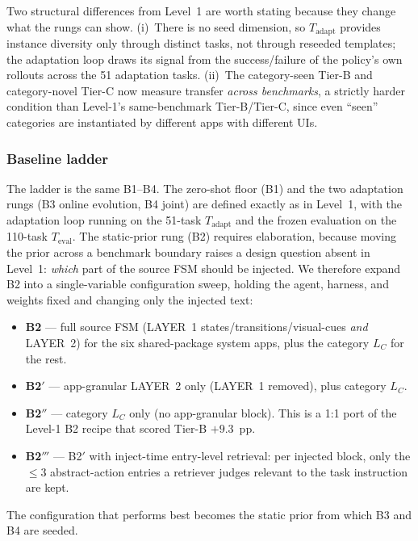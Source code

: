 Two structural differences from Level~1 are worth stating because they change
what the rungs can show. (i)~There is no seed dimension, so $T_{\text{adapt}}$
provides instance diversity only through distinct tasks, not through reseeded
templates; the adaptation loop draws its signal from the success/failure of the
policy's own rollouts across the 51 adaptation tasks. (ii)~The category-seen
Tier-B and category-novel Tier-C now measure transfer \emph{across benchmarks},
a strictly harder condition than Level-1's same-benchmark Tier-B/Tier-C, since
even ``seen'' categories are instantiated by different apps with different UIs.

\subsubsection{Baseline ladder}
\label{sec:exp-cross-baselines}

The ladder is the same B1--B4. The zero-shot floor (B1) and the two adaptation
rungs (B3 online evolution, B4 joint) are defined exactly as in Level~1, with
the adaptation loop running on the 51-task $T_{\text{adapt}}$ and the frozen
evaluation on the 110-task $T_{\text{eval}}$. The static-prior rung (B2)
requires elaboration, because moving the prior across a benchmark boundary
raises a design question absent in Level~1: \emph{which} part of the source FSM
should be injected. We therefore expand B2 into a single-variable configuration
sweep, holding the agent, harness, and weights fixed and changing only the
injected text:

\begin{itemize}
\item \textbf{B2} --- full source FSM (LAYER~1 states/transitions/visual-cues
\emph{and} LAYER~2) for the six shared-package system apps, plus the category
$L_C$ for the rest.
\item \textbf{B2$'$} --- app-granular LAYER~2 only (LAYER~1 removed), plus
category $L_C$.
\item \textbf{B2$''$} --- category $L_C$ only (no app-granular block). This is a
1:1 port of the Level-1 B2 recipe that scored Tier-B $+9.3$~pp.
\item \textbf{B2$'''$} --- B2$'$ with inject-time entry-level retrieval: per
injected block, only the $\le 3$ abstract-action entries a retriever judges
relevant to the task instruction are kept.
\end{itemize}

The configuration that performs best becomes the static prior from which B3 and
B4 are seeded.

